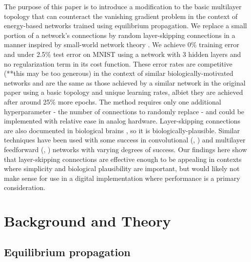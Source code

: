 \documentclass{article}
\begin{document}
The purpose of this paper is to introduce a modification to the basic multilayer topology that can counteract the vanishing gradient problem in the context of energy-based networks trained using equilibrium propagation. We replace a small portion of a network's connections by random layer-skipping connections in a manner inspired by small-world network theory \cite{watts98}. We achieve 0\% training error and under 2.5\% test error on MNIST using a network with 3 hidden layers and no regularization term in its cost function. These error rates are competitive (**this may be too generous) in the context of similar biologically-motivated networks \cite{bartunov2018} and are the same as those achieved by a similar network in the original paper using a basic topology and unique learning rates, albiet they are achieved after around 25\% more epochs. The method requires only one additional hyperparameter - the number of connections to randomly replace - and could be implemented with relative ease in analog hardware. Layer-skipping connections are also documented in biological brains \cite{bullmore2009}, so it is biologically-plausible. Similar techniques have been used with some success in convolutional (\cite{he2015}, \cite{srivastava2015}) and multilayer feedforward (\cite{xiaohu2011}, \cite{krishnan2019}) networks with varying degrees of success. Our findings here show that layer-skipping connections are effective enough to be appealing in contexts where simplicity and biological plausibility are important, but would likely not make sense for use in a digital implementation where performance is a primary consideration.


\section{Background and Theory}

\subsection{Equilibrium propagation}
\end{document}
